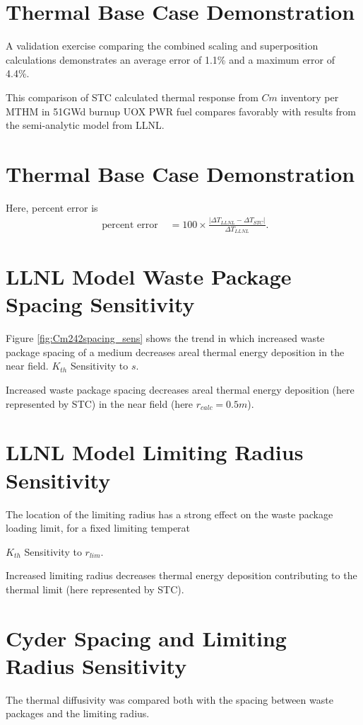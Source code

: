 \documentclass[letterpaper]{article}
\begin{document}
  \section*{Thermal Base Case Demonstration}
A validation exercise comparing the combined scaling and  
superposition calculations demonstrates an average error of 1.1\% and a 
maximum error of 4.4\%.

This comparison of STC calculated thermal response from $Cm$ 
inventory per MTHM in 51GWd burnup UOX PWR fuel compares favorably with results 
from the semi-analytic model from LLNL.


  \section*{Thermal Base Case Demonstration}
Here, percent error is 
\begin{align}
\mbox{ percent error } &= 100\times\frac{\left|\Delta T_{LLNL} - \Delta 
T_{STC}\right|}{ \Delta T_{LLNL}}.
\end{align}

\section*{LLNL Model Waste Package Spacing Sensitivity}
  Figure \ref{fig:Cm242spacing_sens} shows the trend in which increased waste 
  package spacing of a medium decreases areal thermal energy 
  deposition in the near field.
  $K_{th}$ Sensitivity to $s$.
  
  Increased waste package 
  spacing decreases areal thermal energy deposition 
  (here represented by STC) in the near field (here $r_{calc} = 0.5m$).


\section*{LLNL Model Limiting Radius Sensitivity}
  The location of the limiting radius has a strong effect on the 
  waste package loading limit, for a fixed limiting temperat
  
  $K_{th}$ Sensitivity to $r_{lim}$.
  
  Increased limiting radius decreases thermal energy deposition contributing to 
  the thermal limit (here represented by STC).

\section*{Cyder Spacing and Limiting Radius Sensitivity}
  The thermal diffusivity was compared both with the 
  spacing between waste packages and the limiting radius. 
\end{document}
